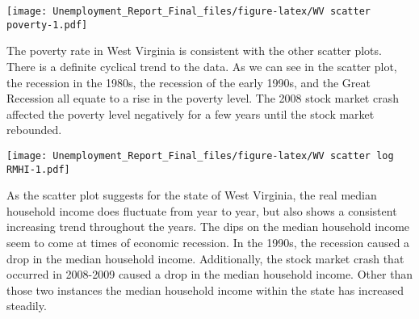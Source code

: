 \documentclass[
]{article}
\newenvironment{Shaded}{\begin{snugshade}}{\end{snugshade}}
\newcommand{\CharTok}[1]{\textcolor[rgb]{0.31,0.60,0.02}{#1}}
\newcommand{\CommentTok}[1]{\textcolor[rgb]{0.56,0.35,0.01}{\textit{#1}}}
\newcommand{\DataTypeTok}[1]{\textcolor[rgb]{0.13,0.29,0.53}{#1}}
\newcommand{\DecValTok}[1]{\textcolor[rgb]{0.00,0.00,0.81}{#1}}
\newcommand{\KeywordTok}[1]{\textcolor[rgb]{0.13,0.29,0.53}{\textbf{#1}}}
\newcommand{\NormalTok}[1]{#1}
\newcommand{\OperatorTok}[1]{\textcolor[rgb]{0.81,0.36,0.00}{\textbf{#1}}}
\newcommand{\StringTok}[1]{\textcolor[rgb]{0.31,0.60,0.02}{#1}}
\begin{document}
\texttt{[image: Unemployment\_Report\_Final\_files/figure-latex/WV scatter poverty-1.pdf]}

The poverty rate in West Virginia is consistent with the other scatter
plots. There is a definite cyclical trend to the data. As we can see in
the scatter plot, the recession in the 1980s, the recession of the early
1990s, and the Great Recession all equate to a rise in the poverty
level. The 2008 stock market crash affected the poverty level negatively
for a few years until the stock market rebounded.

\begin{Shaded}
\end{Shaded}

\texttt{[image: Unemployment\_Report\_Final\_files/figure-latex/WV scatter log RMHI-1.pdf]}

As the scatter plot suggests for the state of West Virginia, the real
median household income does fluctuate from year to year, but also shows
a consistent increasing trend throughout the years. The dips on the
median household income seem to come at times of economic recession. In
the 1990s, the recession caused a drop in the median household income.
Additionally, the stock market crash that occurred in 2008-2009 caused a
drop in the median household income. Other than those two instances the
median household income within the state has increased steadily.

\begin{Shaded}
\end{Shaded}
\end{document}
